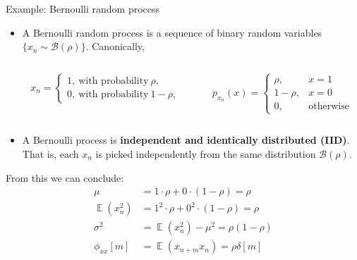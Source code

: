 \documentclass[10pt]{beamer}
\DeclareMathOperator{\E}{\mathbb{E}} %
\begin{document}
\begin{frame}{Example: Bernoulli random process}
	
	\begin{itemize}
		\item A Bernoulli random process is a sequence of binary random variables $\{x_n \sim \mathcal{B}(\rho)\}$. Canonically, 
		\begin{columns}
			\begin{column}{0.5\linewidth}
				\begin{equation*}
				x_n = \begin{cases}
				1,~\text{with probability}~\rho, \\
				0,~\text{with probability}~1-\rho,
				\end{cases}
				\end{equation*}
			\end{column}
			\begin{column}{0.5\linewidth}
				\begin{equation*}
				p_{x_n}(x) = \begin{cases}
				\rho, &x = 1 \\
				1-\rho, &x = 0 \\
				0, &\text{otherwise}
				\end{cases}
				\end{equation*}
			\end{column}
		\end{columns}
		\item A Bernoulli process is \textbf{independent and identically distributed (IID)}. That is, each $x_n$ is picked independently from the same distribution $\mathcal{B}(\rho)$.
	\end{itemize}
	From this we can conclude:
	\begin{align*} 
	\mu &= 1\cdot\rho + 0\cdot(1-\rho) = \rho \\
	\E(x_n^2) &= 1^2\cdot\rho + 0^2\cdot(1-\rho) = \rho \\
	\sigma^2 &= \E(x_n^2) - \mu^2 = \rho(1 - \rho) \\
	\phi_{xx}[m] &=\E(x_{n+m}x_n) = \rho\delta[m] \tag{since it is IID}
	\end{align*}
	
\end{frame}
\end{document}
